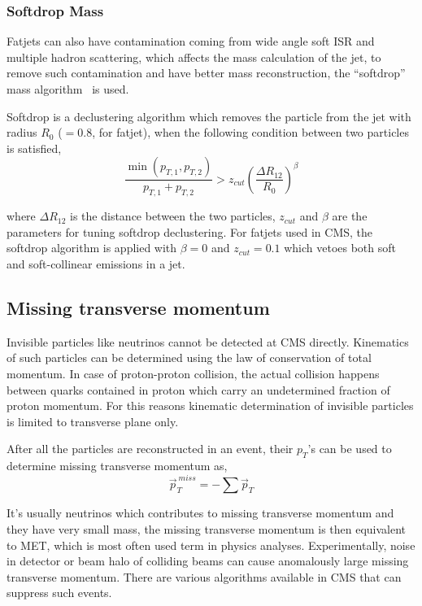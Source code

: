 \subsubsection{
  Softdrop Mass
}

Fatjets can also have contamination coming from wide angle
soft \gls{ISR} and multiple hadron scattering,
which affects the mass calculation of the jet, to remove
such contamination and have better mass reconstruction, the
``softdrop'' mass algorithm~\cite{softdrop-mass-2014} is used.

Softdrop is a declustering algorithm which removes the particle from the jet
with radius \( R_0 \) (\(=0.8\), for fatjet), when the following condition between two particles is satisfied,
%
\begin{equation}
  \frac{\min(p_{T,1}, p_{T,2})}{p_{T,1} + p_{T,2}} > z_{cut} {\left( \frac{\Delta R_{12}}{R_0} \right)}^{\beta}
\end{equation}

where \( \Delta R_{12} \) is the distance between the two particles, \( z_{cut} \)
and \( \beta \) are the parameters for tuning softdrop declustering.
For fatjets used in \gls{CMS}, the softdrop algorithm is applied with
\( \beta = 0\) and \( z_{cut} = 0.1\) which vetoes both soft
and soft-collinear emissions in a jet.

\subsection{
  Missing transverse momentum
}

Invisible particles like neutrinos cannot be detected at \gls{CMS} directly.
Kinematics of such particles can be determined using the law of conservation of
total momentum. In case of proton-proton collision,
the actual collision happens between quarks contained in
proton which carry an undetermined fraction of proton momentum.
For this reasons kinematic determination
of invisible particles is limited to transverse plane only.

After all the particles are reconstructed in an event, their \( p_T \)'s
can be used to determine missing transverse momentum as,
%
\begin{equation}
  \vec{p}_{T}^{~miss} = - \sum \vec{p}_{T}
\end{equation}

It's usually neutrinos which contributes to missing transverse momentum
and they have very small mass, the missing transverse momentum is then
equivalent to \gls{MET}, which is most often used term in physics analyses.
Experimentally, noise in detector or beam halo of colliding beams
can cause anomalously large missing transverse momentum. There are
various algorithms available in \gls{CMS} that can suppress such events.

